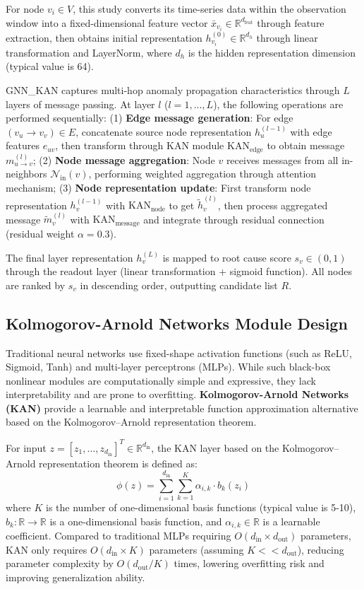 \documentclass[conference]{IEEEtran}
\begin{document}
For node $v_i \in V$, this study converts its time-series data within the observation window into a fixed-dimensional feature vector $\bar{x}_{v_i} \in \mathbb{R}^{d_{\text{feat}}}$ through feature extraction, then obtains initial representation $h_{v_i}^{(0)} \in \mathbb{R}^{d_h}$ through linear transformation and LayerNorm, where $d_h$ is the hidden representation dimension (typical value is 64).

GNN\_KAN captures multi-hop anomaly propagation characteristics through $L$ layers of message passing. At layer $l$ ($l = 1, ..., L$), the following operations are performed sequentially: (1) \textbf{Edge message generation}: For edge $(v_u \to v_v) \in E$, concatenate source node representation $h_u^{(l-1)}$ with edge features $e_{uv}$, then transform through KAN module $\text{KAN}_{\text{edge}}$ to obtain message $m_{u \to v}^{(l)}$; (2) \textbf{Node message aggregation}: Node $v$ receives messages from all in-neighbors $\mathcal{N}_{\text{in}}(v)$, performing weighted aggregation through attention mechanism; (3) \textbf{Node representation update}: First transform node representation $h_v^{(l-1)}$ with $\text{KAN}_{\text{node}}$ to get $\tilde{h}_v^{(l)}$, then process aggregated message $\tilde{m}_v^{(l)}$ with $\text{KAN}_{\text{message}}$ and integrate through residual connection (residual weight $\alpha=0.3$).

The final layer representation $h_v^{(L)}$ is mapped to root cause score $s_v \in (0, 1)$ through the readout layer (linear transformation + sigmoid function). All nodes are ranked by $s_v$ in descending order, outputting candidate list $R$.

\subsection{Kolmogorov-Arnold Networks Module Design}

Traditional neural networks use fixed-shape activation functions (such as ReLU, Sigmoid, Tanh) and multi-layer perceptrons (MLPs). While such black-box nonlinear modules are computationally simple and expressive, they lack interpretability and are prone to overfitting. \textbf{Kolmogorov-Arnold Networks (KAN)} provide a learnable and interpretable function approximation alternative based on the Kolmogorov--Arnold representation theorem.

For input $z = [z_1, \ldots, z_{d_{\text{in}}}]^T \in \mathbb{R}^{d_{\text{in}}}$, the KAN layer based on the Kolmogorov--Arnold representation theorem \cite{kolmogorov1957} is defined \cite{kan2024} as:
\begin{equation}
\phi(z) = \sum_{i=1}^{d_{\text{in}}} \sum_{k=1}^{K} \alpha_{i,k} \cdot b_k(z_i)
\end{equation}
where $K$ is the number of one-dimensional basis functions (typical value is 5-10), $b_k: \mathbb{R} \to \mathbb{R}$ is a one-dimensional basis function, and $\alpha_{i,k} \in \mathbb{R}$ is a learnable coefficient. Compared to traditional MLPs requiring $O(d_{\text{in}} \times d_{\text{out}})$ parameters, KAN only requires $O(d_{\text{in}} \times K)$ parameters (assuming $K << d_{\text{out}}$), reducing parameter complexity by $O(d_{\text{out}}/K)$ times, lowering overfitting risk and improving generalization ability.
\end{document}
